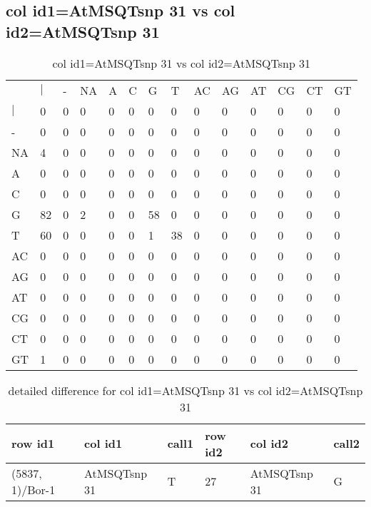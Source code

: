 \subsection{col id1=AtMSQTsnp 31 vs col id2=AtMSQTsnp 31}
\begin{center}
\begin{longtable}{|l|l|l|l|l|l|l|l|l|l|l|l|l|l|}
\caption{col id1=AtMSQTsnp 31 vs col id2=AtMSQTsnp 31} \label{table_dm654}\\
\hline
\\
\hline
&$|$&-&NA&A&C&G&T&AC&AG&AT&CG&CT&GT\\
$|$&0&0&0&0&0&0&0&0&0&0&0&0&0\\
-&0&0&0&0&0&0&0&0&0&0&0&0&0\\
NA&4&0&0&0&0&0&0&0&0&0&0&0&0\\
A&0&0&0&0&0&0&0&0&0&0&0&0&0\\
C&0&0&0&0&0&0&0&0&0&0&0&0&0\\
G&82&0&2&0&0&58&0&0&0&0&0&0&0\\
T&60&0&0&0&0&1&38&0&0&0&0&0&0\\
AC&0&0&0&0&0&0&0&0&0&0&0&0&0\\
AG&0&0&0&0&0&0&0&0&0&0&0&0&0\\
AT&0&0&0&0&0&0&0&0&0&0&0&0&0\\
CG&0&0&0&0&0&0&0&0&0&0&0&0&0\\
CT&0&0&0&0&0&0&0&0&0&0&0&0&0\\
GT&1&0&0&0&0&0&0&0&0&0&0&0&0\\
\hline
\end{longtable}
\end{center}

\begin{center}
\begin{longtable}{|l|l|l|l|l|l|}
\caption{detailed difference for col id1=AtMSQTsnp 31 vs col id2=AtMSQTsnp 31} \label{table_dm655}\\
\hline
row id1&col id1&call1&row id2&col id2&call2\\
\hline
(5837, 1)/Bor-1&AtMSQTsnp 31&T&27&AtMSQTsnp 31&G\\
\hline
\end{longtable}
\end{center}

